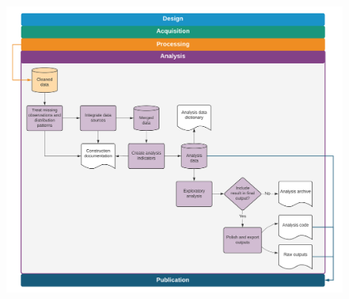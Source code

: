 \begin{fullwidth}
	\begin{figure}
		\centering
		\includegraphics[width=1.6\linewidth]{diagrams/Analysis}
		\label{fig:analysis}
	\end{figure}
\end{fullwidth}

